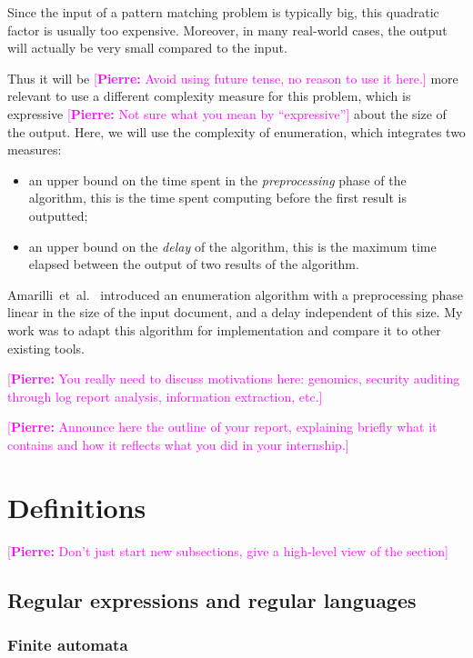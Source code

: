 \documentclass[12px]{article}
\theoremstyle{definition}
\newcommand{\pierre}[1]{\textcolor{magenta}{[\textbf{Pierre:} #1]}}
\begin{document}
    Since the input of a pattern matching problem is typically big, this
    quadratic factor is usually too expensive. Moreover, in many real-world
    cases, the output will actually be very small compared to the input.

    Thus it will be \pierre{Avoid using future tense, no reason to use it
    here.} more relevant to use a different complexity measure for
    this problem, which is expressive \pierre{Not sure what you mean by
    ``expressive''} about the size of the output. Here, we
    will use the complexity of enumeration, which integrates two measures:
    \begin{itemize}
      \item an upper bound on the time spent in the \textit{preprocessing}
        phase of the algorithm, this is the time spent computing before the
        first result is outputted;
      \item an upper bound on the \textit{delay} of the algorithm, this is
        the maximum time elapsed between the output of two results of the
        algorithm.
    \end{itemize}

    Amarilli~et~al.~\cite{ICDT19} introduced an enumeration algorithm with a
    preprocessing phase linear in the size of the input document, and a delay
    independent of this size. My work was to adapt this algorithm for
    implementation and compare it to other existing tools.

    \pierre{You really need to discuss motivations here: genomics,
    security auditing through log report analysis, information
    extraction, etc.}

    \pierre{Announce here the outline of your report, explaining briefly
    what it contains and how it reflects what you did in your
    internship.}


  \section{Definitions}

  \pierre{Don't just start new subsections, give a high-level view of the
  section}

    \subsection{Regular expressions and regular languages}

      \subsubsection{Finite automata}
\end{document}
